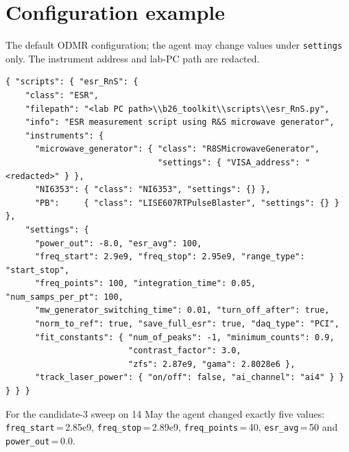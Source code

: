 \documentclass[10pt]{article}
\newcommand{\code}[1]{\texttt{#1}}
\begin{document}
\section{Configuration example}
\label{app:config}
The default ODMR configuration; the agent may change values under \code{settings} only. The instrument address and lab-PC path are redacted.
\begin{Verbatim}[fontsize=\footnotesize,frame=single,framesep=2mm]
{ "scripts": { "esr_RnS": {
    "class": "ESR",
    "filepath": "<lab PC path>\\b26_toolkit\\scripts\\esr_RnS.py",
    "info": "ESR measurement script using R&S microwave generator",
    "instruments": {
      "microwave_generator": { "class": "R8SMicrowaveGenerator",
                               "settings": { "VISA_address": "<redacted>" } },
      "NI6353": { "class": "NI6353", "settings": {} },
      "PB":     { "class": "LISE607RTPulseBlaster", "settings": {} } },
    "settings": {
      "power_out": -8.0, "esr_avg": 100,
      "freq_start": 2.9e9, "freq_stop": 2.95e9, "range_type": "start_stop",
      "freq_points": 100, "integration_time": 0.05, "num_samps_per_pt": 100,
      "mw_generator_switching_time": 0.01, "turn_off_after": true,
      "norm_to_ref": true, "save_full_esr": true, "daq_type": "PCI",
      "fit_constants": { "num_of_peaks": -1, "minimum_counts": 0.9,
                         "contrast_factor": 3.0,
                         "zfs": 2.87e9, "gama": 2.8028e6 },
      "track_laser_power": { "on/off": false, "ai_channel": "ai4" } } } } }
\end{Verbatim}
For the candidate-3 sweep on 14 May the agent changed exactly five values: \code{freq\_start}\,=\,2.85e9, \code{freq\_stop}\,=\,2.89e9, \code{freq\_points}\,=\,40, \code{esr\_avg}\,=\,50 and \code{power\_out}\,=\,0.0.
\end{document}
